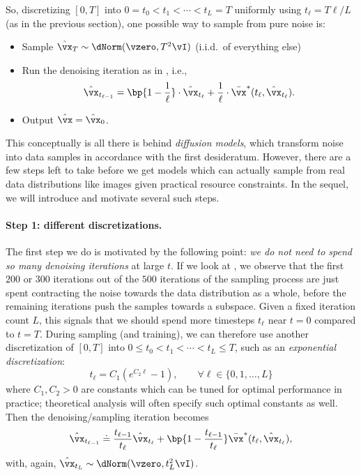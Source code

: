 \documentclass[../../book-main.tex]{subfiles}
\begin{document}
So, discretizing \([0, T]\) into \(0 = t_{0} < t_{1} < \cdots < t_{L} = T\) uniformly using \(t_{\ell} = T\ell / L\) (as in the previous section), one possible way to sample from pure noise is:
\begin{itemize}
	\item Sample \(\hat{\vx}_{T} \sim \dNorm(\vzero, T^{2}\vI)\) (i.i.d.~of everything else) 
	\item Run the denoising iteration as in , i.e.,
		\begin{equation}\label{eq:denoising-iteration-basic}
		\hat{\vx}_{t_{\ell - 1}} = \bp{1 - \frac{1}{\ell}}\cdot\hat{\vx}_{t_{\ell}} + \frac{1}{\ell}\cdot\bar{\vx}^{\ast}(t_{\ell}, \hat{\vx}_{t_{\ell}}).
	\end{equation}
	\item Output \(\hat{\vx} = \hat{\vx}_{0}\).
\end{itemize}
This conceptually is all there is behind \textit{diffusion models}, which transform noise into data samples in accordance with the first desideratum. However, there are a few steps left to take before we get models which can actually sample from real data distributions like images given practical resource constraints. In the sequel, we will introduce and motivate several such steps.

\paragraph{Step 1: different discretizations.} The first step we do is motivated by the following point: \textit{we do not need to spend so many denoising iterations} at large  \(t\). If we look at , we observe that the first \(200\) or \(300\) iterations out of the \(500\) iterations of the sampling process are just spent contracting the noise towards the data distribution as a whole, before the remaining iterations push the samples towards a subspace. Given a fixed iteration count \(L\), this signals that we should spend more timesteps \(t_{\ell}\) near \(t = 0\) compared to \(t = T\). During sampling (and training), we can therefore use another discretization of \([0, T]\) into \(0 \leq t_{0} < t_{1} < \cdots < t_{L} \leq T\), such as an \textit{exponential discretization}:
\begin{equation}\label{eq:denoising_exponential_discretization}
	t_{\ell} = C_{1}(e^{C_{2}\ell} - 1), \qquad \forall \ell \in \{0, 1, \dots, L\}
\end{equation}
where \(C_{1}, C_{2} > 0\) are constants which can be tuned for optimal performance in practice; theoretical analysis will often specify such optimal constants as well. Then the denoising/sampling iteration becomes 
\begin{equation}\label{eq:denoising_iteration}
	\hat{\vx}_{t_{\ell - 1}} \doteq \frac{t_{\ell - 1}}{t_{\ell}}\hat{\vx}_{t_{\ell}} + \bp{1 - \frac{t_{\ell - 1}}{t_{\ell}}}\bar{\vx}^{\ast}(t_{\ell}, \hat{\vx}_{t_{\ell}}),
\end{equation}
with, again, \(\hat{\vx}_{t_{L}} \sim \dNorm(\vzero, t_{L}^{2}\vI)\).
\end{document}
